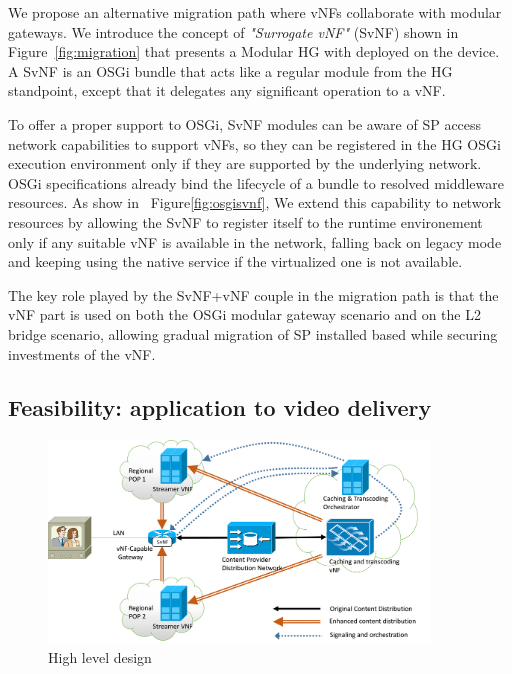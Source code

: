 We propose an alternative migration path where vNFs collaborate with modular gateways. We introduce the concept of \textit{"Surrogate vNF"} (SvNF) shown in Figure~\ref{fig:migration} that presents a Modular HG with  deployed on the device.
A SvNF is an OSGi bundle that acts like a regular module from the HG standpoint, except that it delegates any significant operation to a vNF.

To offer a proper support to OSGi, SvNF modules can be aware of SP access network capabilities to support vNFs, so they can be registered in the HG OSGi execution environment only if they are supported by the underlying network.
OSGi specifications already bind the lifecycle of a bundle to resolved middleware resources. 
As show in ~Figure\ref{fig:osgisvnf}, We extend this capability to network resources by allowing the SvNF to register itself to the runtime environement only if any suitable vNF is available in the network, falling back on legacy mode and keeping using the native service if the virtualized one is not available.

The key role played by the SvNF+vNF couple in the migration path is that the vNF part is used on both the OSGi modular gateway scenario and on the L2 bridge scenario, allowing gradual migration of SP installed based while securing investments of the vNF.
 
\subsection{Feasibility: application to video delivery}
\begin{figure}
	
	\center

	\includegraphics[width=0.90\textwidth,natwidth=8132,natheight=4335]{fig/highleveldesign.png}
	\caption{ High level design
    \label{fig:hld}
    }

\end{figure}

